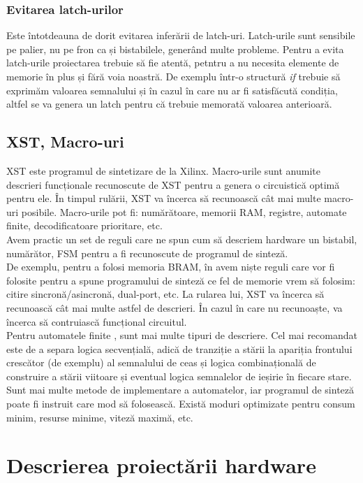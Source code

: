 \documentclass[12pt,twoside,a4paper,fleqn]{book}
\theoremstyle{definition}
\begin{document}
\subsection{Evitarea latch-urilor}
Este întotdeauna de dorit evitarea inferării de latch-uri. Latch-urile sunt sensibile pe palier, nu pe fron ca și bistabilele, generând multe probleme. Pentru a evita latch-urile proiectarea trebuie să fie atentă, petntru a nu necesita elemente de memorie în plus și fără voia noastră. De exemplu într-o structură \emph{if} trebuie să exprimăm valoarea semnalului și în cazul în care nu ar fi satisfăcută condiția, altfel se va genera un latch pentru că trebuie memorată valoarea anterioară.


\section{XST, Macro-uri}
XST este programul de sintetizare de la Xilinx. Macro-urile sunt anumite descrieri funcționale recunoscute de XST pentru a genera o circuistică optimă pentru ele. În timpul rulării, XST va încerca să recunoască cât mai multe macro-uri posibile. Macro-urile pot fi: numărătoare, memorii RAM, registre, automate finite, decodificatoare prioritare, etc. \cite{xilinx_xst}\\
Avem practic un set de reguli care ne spun cum să descriem hardware un bistabil, numărător, FSM pentru a fi recunoscute de programul de sinteză.\\
De exemplu, pentru a folosi memoria BRAM, în \cite{xilinx_xst} avem niște reguli care vor fi folosite pentru a spune programului de sinteză ce fel de memorie vrem să folosim: citire sincronă/asincronă, dual-port, etc. La rularea lui, XST va încerca să recunoască cât mai multe astfel de descrieri. În cazul în care nu recunoaște, va încerca să contruiască funcțional circuitul.\\
Pentru automatele finite \cite{xilinx_xst, peter_verilog}, sunt mai multe tipuri de descriere. Cel mai recomandat este de a separa logica secvențială, adică de tranziție a stării la apariția frontului crescător (de exemplu) al semnalului de ceas și logica combinațională de construire a stării viitoare și eventual logica semnalelor de ieșirie în fiecare stare. Sunt mai multe metode de implementare a automatelor, iar programul de sinteză poate fi instruit care mod să folosească. Există moduri optimizate pentru consum minim, resurse minime, viteză maximă, etc.

\chapter{Descrierea proiectării hardware}
\end{document}

